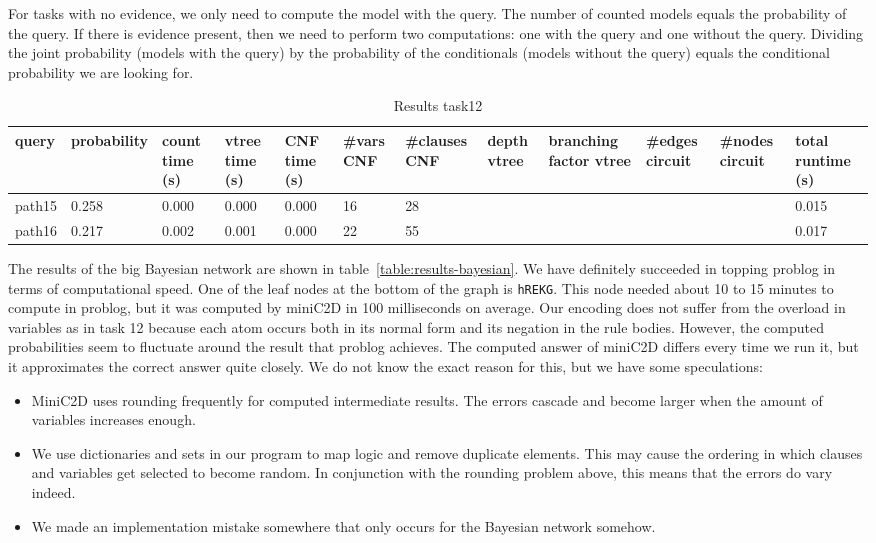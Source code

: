 For tasks with no evidence, we only need to compute the model with the query. The number of counted models equals the probability of the query. If there is evidence present, then we need to perform two computations: one with the query and one without the query. Dividing the joint probability (models with the query) by the probability of the conditionals (models without the query) equals the conditional probability we are looking for.

\begin{table}[h]
\centering
\caption{Results task12}
\label{table:results-task12}
\begin{tabular}{l|l|l|l|l|l|l|l|l|l|l|l}
\textbf{query} & \textbf{probability} & \textbf{count time (s)} & \textbf{vtree time (s)} & \textbf{CNF time (s)} & \textbf{\#vars CNF} & \textbf{\#clauses CNF} & \textbf{depth vtree} & \textbf{branching factor vtree} & \textbf{\#edges circuit} & \textbf{\#nodes circuit} & \textbf{total runtime (s)} \\ \hline
path15 &  0.258  & 0.000 & 0.000 & 0.000 & 16 & 28 &  &  &  &   &  0.015 \\
path16 & 0.217 &  0.002  & 0.001 & 0.000 & 22 & 55 &  &  &  &   &  0.017
\end{tabular}
\end{table}

The results of the big Bayesian network are shown in table~\ref{table:results-bayesian}. We have definitely succeeded in topping problog in terms of computational speed. One of the leaf nodes at the bottom of the graph is \texttt{hREKG}. This node needed about 10 to 15 minutes to compute in problog, but it was computed by miniC2D in 100 milliseconds on average. Our encoding does not suffer from the overload in variables as in task 12 because each atom occurs both in its normal form and its negation in the rule bodies. However, the computed probabilities seem to fluctuate around the result that problog achieves. The computed answer of miniC2D differs every time we run it, but it approximates the correct answer quite closely. We do not know the exact reason for this, but we have some speculations:
\begin{itemize}
\item MiniC2D uses rounding frequently for computed intermediate results. The errors cascade and become larger when the amount of variables increases enough.
\item We use dictionaries and sets in our program to map logic and remove duplicate elements. This may cause the ordering in which clauses and variables get selected to become random. In conjunction with the rounding problem above, this means that the errors do vary indeed.
\item We made an implementation mistake somewhere that only occurs for the Bayesian network somehow.
\end{itemize}


